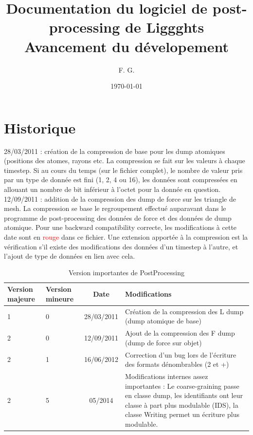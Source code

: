 \documentclass[a4paper,12pt]{article}
\title{Documentation du logiciel de post-processing de Liggghts \\ Avancement du d\'evelopement}
\author{F. G.}
\date{\today}
\begin{document}
\maketitle
\tableofcontents
\newpage

\section{Historique}
28/03/2011 : cr\'eation de la compression de base pour les dump atomiques (positions des atomes, rayons etc. La compression se fait sur les valeurs \`a chaque timestep. Si au cours du temps (sur le fichier complet), le nombre de valeur pris par un type de donn\'ee est fini (1, 2, 4 ou 16), les donn\'ees sont compress\'ees en allouant un nombre de bit inf\'erieur \`a l'octet pour la donn\'ee en question.\\
12/09/2011 : addition de la compression des dump de force sur les triangle de mesh. La compression se base le regroupement effectu\'e auparavant dans le programme de post-processing des donn\'ees de force et des donn\'ees de dump atomique. Pour une backward compatibility correcte, les modifications \`a cette date sont en \textcolor{red}{rouge} dans ce fichier. Une extension apport\'ee \`a la compression est la v\'erification s'il existe des modifications des donn\'ees d'un timestep \`a l'autre, et l'ajout de type de donn\'ees en lien avec cela.

\begin{table}
\begin{tabular}{|l|l|c|p{6cm}|}\hline
Version majeure & Version mineure & Date & Modifications \\ \hline
1 & 0 & 28/03/2011 & Cr\'eation de la compression des L dump (dump atomique de base) \\ \hline
2 & 0 & 12/09/2011 & Ajout de la compression des F dump (dump de force sur objet) \\ \hline
2 & 1 & 16/06/2012 & Correction d'un bug lors de l'\'ecriture des formats d\'enombrables (2 et +) \\ \hline
2 & 5 & 05/2014 & Modifications internes assez importantes : Le coarse-graining passe en classe dump, les identifiants ont leur classe \`a part plus modulable (IDS), la classe Writing permet un \'ecriture plus modulable. \\ \hline
\end{tabular}
\caption{Version importantes de PostProcessing}
\end{table}
\end{document}
